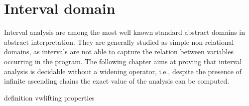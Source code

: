\section{Interval domain}\label{sec:intervals}

Interval analysis are among the most well known standard abstract
domains in abstract interpretation. They are generally studied as
simple non-relational domains, as intervals are not able to capture
the relation between variables occurring in the program.  The
following chapter aims at proving that interval analysis is decidable
without a widening operator, i.e., despite the presence of infinite
ascending chains the exact value of the analysis can be computed.

{definition}
{vwlifting}
{properties}
